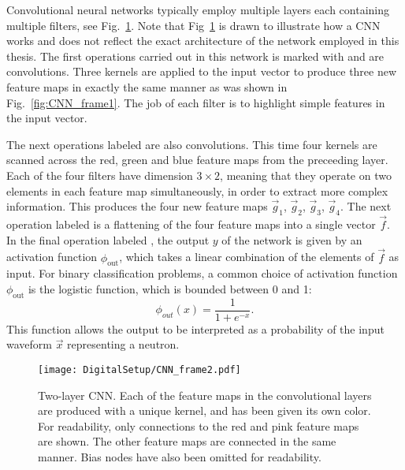 \documentclass[main.tex]{subfiles}
\begin{document}
Convolutional neural networks typically employ multiple layers each containing multiple filters, see Fig.~\ref{fig:CNN_frame2}. Note that Fig~\ref{fig:CNN_frame2} is drawn to illustrate how a CNN works and does not reflect the exact architecture of the network employed in this thesis.  The first operations carried out in this network is marked with  and are convolutions. Three kernels are applied to the input vector to produce three new feature maps in exactly the same manner as was shown in Fig.~\ref{fig:CNN_frame1}. The job of  each filter is to highlight simple features in the input vector.

The next operations labeled  are also convolutions. This time four kernels are scanned across the red, green and blue feature maps from the preceeding layer. Each of the four filters have dimension $3\times2$, meaning that they operate on two elements in each feature map simultaneously, in order to extract more complex information. This produces the four new feature maps $\vec g_1$, $\vec g_2$, $\vec g_3$, $\vec g_4$. The next operation labeled  is a flattening of the four feature maps into a single vector $\vec f$. In the final operation labeled , the output $y$ of the network is given by an activation function $\phi_{\textrm{out}}$, which takes a linear combination of the elements of $\vec f$ as input. For binary classification problems, a common choice of activation function $\phi_{\textrm{out}}$ is the logistic function, which is bounded between 0 and 1:
\begin{equation}
	\phi_{out}(x) = \frac{1}{1+e^{-x}}.
\end{equation}
This function allows the output to be interpreted as a probability of the input waveform $\vec{x}$ representing a neutron.

\begin{figure}[ht!]
    \centering
        \texttt{[image: DigitalSetup/CNN\_frame2.pdf]}
        \caption[Two-layer CNN.]{Two-layer CNN. Each of the feature maps in the convolutional layers are produced with a unique kernel, and has been given its own color. For readability, only connections to the red and pink feature maps are shown. The other feature maps are connected in the same manner. Bias nodes have also been omitted for readability.}
    \label{fig:CNN_frame2} 
\end{figure}
\end{document}
